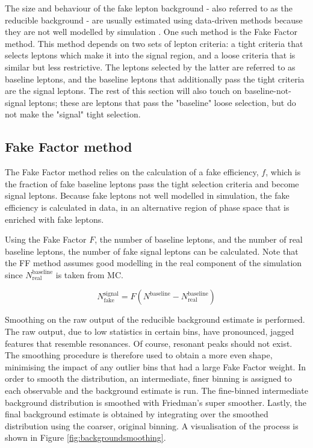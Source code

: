 The size and behaviour of the fake lepton background - also referred to as the reducible background - are usually estimated using data-driven methods because they are not well modelled by simulation \cite{varnes2016poisson}. One such method is the Fake Factor method. This method depends on two sets of lepton criteria: a tight criteria that selects leptons which make it into the signal region, and a loose criteria that is similar but less restrictive. The leptons selected by the latter are referred to as baseline leptons, and the baseline leptons that additionally pass the tight criteria are the signal leptons. The rest of this section will also touch on baseline-not-signal leptons; these are leptons that pass the "baseline" loose selection, but do not make the "signal" tight selection. 

\subsection{Fake Factor method}

The Fake Factor method relies on the calculation of a fake efficiency, $f$, which is the fraction of fake baseline leptons pass the tight selection criteria and become signal leptons. Because fake leptons not well modelled in simulation, the fake efficiency is calculated in data, in an alternative region of phase space that is enriched with fake leptons. 

Using the Fake Factor $F$, the number of baseline leptons, and the number of real baseline leptons, the number of fake signal leptons can be calculated. Note that the FF method assumes good modelling in the real component of the simulation since $N^{\text{baseline}}_{\text{real}}$ is taken from MC.

$$N_{\text{fake}}^{\text{signal}} = F(N^{\text{baseline}}-N^{\text{baseline}}_{\text{real}})$$


Smoothing on the raw output of the reducible background estimate is performed. The raw output, due to low statistics in certain bins, have pronounced, jagged features that resemble resonances. Of course, resonant peaks should not exist. The smoothing procedure is therefore used to obtain a more even shape, minimising the impact of any outlier bins that had a large Fake Factor weight. In order to smooth the distribution, an intermediate, finer binning is assigned to each observable and the background estimate is run. The fine-binned intermediate background distribution is smoothed with Friedman's super smoother. Lastly, the final background estimate is obtained by integrating over the smoothed distribution using the coarser, original binning. A visualisation of the process is shown in Figure \ref{fig:backgroundsmoothing}.

